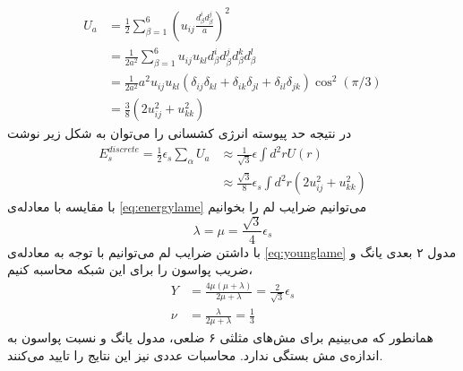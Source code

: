 \begin{equation}
\begin{aligned}
U_a&=\frac{1}{2}\sum_{\beta=1}^6(u_{ij}\frac{d_\beta^id_\beta^j}{a})^2\\
&=\frac{1}{2a^2}\sum_{\beta=1}^6u_{ij}u_{kl}d_\beta^id_\beta^jd_\beta^kd_\beta^l\\
&=\frac{1}{2a^2}a^2u_{ij}u_{kl}(\delta_{ij}\delta_{kl}+\delta_{ik}\delta_{jl}+\delta_{il}\delta_{jk})\cos^2(\pi/3)\\
&=\frac{3}{8}(2u_{ij}^2+u_{kk}^2)
\label{eq:gstrain1}
\end{aligned}
\end{equation}
در نتیجه‌ حد پیوسته انرژی کشسانی را می‌توان به شکل زیر نوشت
\begin{equation}
\begin{aligned}
E_s^{discrete}=\frac{1}{2}\epsilon_s\sum_\alpha U_a&\approx\frac{1}{\sqrt3}\epsilon\int d^2rU(r)\\
&\approx\frac{\sqrt3}{8}\epsilon_s\int d^2r(2u_{ij}^2+u_{kk}^2)
\end{aligned}
\end{equation}
با مقایسه با معادله‌ی 
\ref{eq:energylame}
می‌توانیم ضرایب لم را بخوانیم
\begin{equation}
\lambda=\mu=\frac{\sqrt3}{4}\epsilon_s
\end{equation}
با داشتن ضرایب لم می‌توانیم با توجه به معادله‌ی 
\ref{eq:younglame}
مدول ۲ بعدی یانگ و ضریب پواسون را برای این شبکه محاسبه کنیم،
\begin{equation}
\begin{aligned}
Y&=\frac{4\mu(\mu+\lambda)}{2\mu+\lambda}=\frac{2}{\sqrt3}\epsilon_s\\
\nu&=\frac{\lambda}{2\mu+\lambda}=\frac{1}{3}
\end{aligned}
\end{equation}
همانطور که می‌بینیم برای مش‌های مثلثی ۶ ضلعی، مدول یانگ و نسبت پواسون به اندازه‌ی مش بستگی ندارد. محاسبات عددی
\cite{springnetworkPRE2011}
نیز این نتایج را تایید می‌کنند.



















